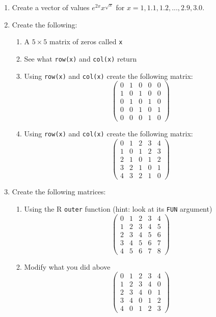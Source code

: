 \documentclass{article}
\begin{document}
\begin{enumerate}

\item Create a vector of values $e^{2x} x^{\sqrt{x}}$ for $x = 1, 1.1, 1.2, ..., 2.9, 3.0$.

\item Create the following:
    \begin{enumerate}
    \item A $5\times5$ matrix of zeros called \texttt{x}
    \item See what \texttt{row(x)} and \texttt{col(x)} return
    \item Using \texttt{row(x)} and \texttt{col(x)} create the following matrix:
      \[ \left( \begin{array}{ccccc}
      0 & 1 & 0 & 0 & 0 \\
      1 & 0 & 1 & 0 & 0 \\
      0 & 1 & 0 & 1 & 0 \\
      0 & 0 & 1 & 0 & 1 \\
      0 & 0 & 0 & 1 & 0 \end{array} \right)\] 
    \item Using \texttt{row(x)} and \texttt{col(x)} create the following matrix:
      \[ \left( \begin{array}{ccccc}
      0 & 1 & 2 & 3 & 4 \\
      1 & 0 & 1 & 2 & 3 \\
      2 & 1 & 0 & 1 & 2 \\
      3 & 2 & 1 & 0 & 1 \\
      4 & 3 & 2 & 1 & 0 \end{array} \right)\] 
    \end{enumerate}

\item Create the following matrices:
    \begin{enumerate}
    \item Using the R \texttt{outer} function (hint: look at its \texttt{FUN} argument)
      \[ \left( \begin{array}{ccccc}
      0 & 1 & 2 & 3 & 4 \\
      1 & 2 & 3 & 4 & 5 \\
      2 & 3 & 4 & 5 & 6 \\
      3 & 4 & 5 & 6 & 7 \\
      4 & 5 & 6 & 7 & 8 \end{array} \right)\]
    \item Modify what you did above
      \[ \left( \begin{array}{ccccc}
      0 & 1 & 2 & 3 & 4 \\
      1 & 2 & 3 & 4 & 0 \\
      2 & 3 & 4 & 0 & 1 \\
      3 & 4 & 0 & 1 & 2 \\
      4 & 0 & 1 & 2 & 3 \end{array} \right)\]
    \end{enumerate}

\end{enumerate}
\end{document}

